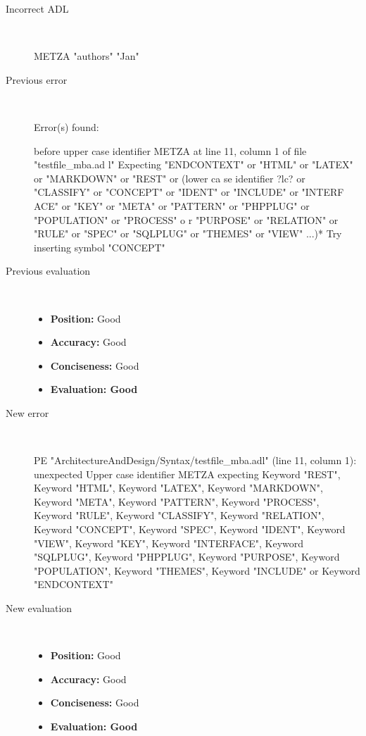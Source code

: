 \begin{description}
  \item[Incorrect ADL]~\\
\begin{adl}
METZA "authors"  "Jan"\end{adl}
  \item[Previous error]~\\
\begin{haskell}
Error(s) found:

before upper case identifier METZA at line 11, column 1 of file "testfile_mba.ad
l"
Expecting "ENDCONTEXT" or "HTML" or "LATEX" or "MARKDOWN" or "REST" or (lower ca
se identifier ?lc? or "CLASSIFY" or "CONCEPT" or "IDENT" or "INCLUDE" or "INTERF
ACE" or "KEY" or "META" or "PATTERN" or "PHPPLUG" or "POPULATION" or "PROCESS" o
r "PURPOSE" or "RELATION" or "RULE" or "SPEC" or "SQLPLUG" or "THEMES" or "VIEW"
 ...)*
Try inserting symbol "CONCEPT"\end{haskell}
  \item[Previous evaluation]~\\
    \begin{itemize}
    \item \textbf{Position:} Good
    \item \textbf{Accuracy:} Good
    \item \textbf{Conciseness:} Good
    \item \textbf{Evaluation: Good}
    \end{itemize}
  \item[New error]~\\
\begin{haskell}
PE "ArchitectureAndDesign/Syntax/testfile_mba.adl" (line 11, column 1):
unexpected Upper case identifier METZA
expecting Keyword "REST", Keyword "HTML", Keyword "LATEX", Keyword "MARKDOWN", Keyword "META", Keyword "PATTERN", Keyword "PROCESS", Keyword "RULE", Keyword "CLASSIFY", Keyword "RELATION", Keyword "CONCEPT", Keyword "SPEC", Keyword "IDENT", Keyword "VIEW", Keyword "KEY", Keyword "INTERFACE", Keyword "SQLPLUG", Keyword "PHPPLUG", Keyword "PURPOSE", Keyword "POPULATION", Keyword "THEMES", Keyword "INCLUDE" or Keyword "ENDCONTEXT"
\end{haskell}
  \item[New evaluation]~\\
    \begin{itemize}
    \item \textbf{Position:} Good
    \item \textbf{Accuracy:} Good
    \item \textbf{Conciseness:} Good
    \item \textbf{Evaluation: Good}
    \end{itemize}
  \end{description}

